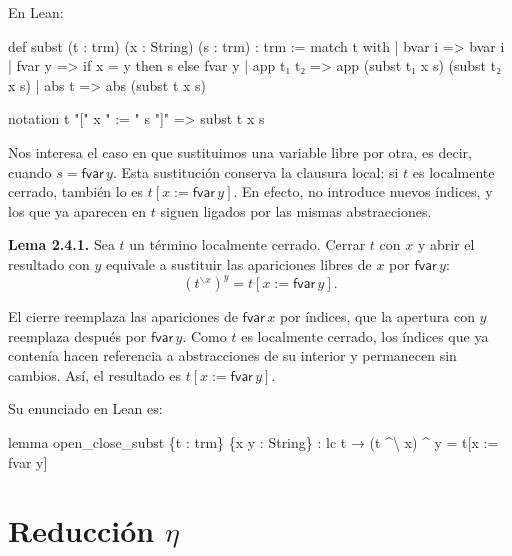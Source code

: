 \documentclass[
  spanish,
  letterpaper,
  DIV=11,
  numbers=noendperiod]{scrreprt}
\newenvironment{Shaded}{\begin{snugshade}}{\end{snugshade}}
\newcommand{\KeywordTok}[1]{\textcolor[rgb]{0.00,0.23,0.31}{\textbf{#1}}}
\newcommand{\NormalTok}[1]{\textcolor[rgb]{0.00,0.23,0.31}{#1}}
\newcommand{\StringTok}[1]{\textcolor[rgb]{0.13,0.47,0.30}{#1}}
\renewcommand{\NormalTok}[1]{\textcolor[HTML]{000000}{#1}}
\renewcommand{\KeywordTok}[1]{\textcolor[HTML]{0000FF}{#1}}
\renewcommand{\StringTok}[1]{\textcolor[HTML]{A52A2A}{#1}}
\let\oldgreater\textgreater
\renewcommand{\textgreater}{\null\oldgreater}%
\theoremstyle{remark}
\begin{document}
En Lean:

\begin{Shaded}
\begin{Highlighting}[]
\KeywordTok{def}\NormalTok{ subst (t : trm) (x : String) (s : trm) : trm :=}
  \KeywordTok{match}\NormalTok{ t }\KeywordTok{with}
\NormalTok{  | bvar i    =\textgreater{} bvar i}
\NormalTok{  | fvar y    =\textgreater{} if x = y then s else fvar y}
\NormalTok{  | app t₁ t₂ =\textgreater{} app (subst t₁ x s) (subst t₂ x s)}
\NormalTok{  | abs t     =\textgreater{} abs (subst t x s)}

\KeywordTok{notation}\NormalTok{ t }\StringTok{"["}\NormalTok{ x }\StringTok{" := "}\NormalTok{ s }\StringTok{"]"}\NormalTok{ =\textgreater{} subst t x s}
\end{Highlighting}
\end{Shaded}

Nos interesa el caso en que sustituimos una variable libre por otra, es
decir, cuando \(s=\mathsf{fvar}\,y\). Esta sustitución conserva la
clausura local: si \(t\) es localmente cerrado, también lo es
\(t[x:=\mathsf{fvar}\,y]\). En efecto, no introduce nuevos índices, y
los que ya aparecen en \(t\) siguen ligados por las mismas
abstracciones.

\textbf{Lema 2.4.1.} Sea \(t\) un término localmente cerrado. Cerrar
\(t\) con \(x\) y abrir el resultado con \(y\) equivale a sustituir las
apariciones libres de \(x\) por \(\mathsf{fvar}\,y\): \[
(t^{\backslash x})^y=t[x:=\mathsf{fvar}\,y].
\]

El cierre reemplaza las apariciones de \(\mathsf{fvar}\,x\) por índices,
que la apertura con \(y\) reemplaza después por \(\mathsf{fvar}\,y\).
Como \(t\) es localmente cerrado, los índices que ya contenía hacen
referencia a abstracciones de su interior y permanecen sin cambios. Así,
el resultado es \(t[x:=\mathsf{fvar}\,y]\).

Su enunciado en Lean es:

\begin{Shaded}
\begin{Highlighting}[]
\KeywordTok{lemma}\NormalTok{ open\_close\_subst \{t : trm\} \{x y : String\} :}
\NormalTok{    lc t → (t \^{}\textbackslash{} x) \^{} y = t[x := fvar y]}
\end{Highlighting}
\end{Shaded}


\chapter{\texorpdfstring{Reducción
\(\eta\)}{Reducción \textbackslash eta}}\label{reducciuxf3n-eta}
\end{document}
